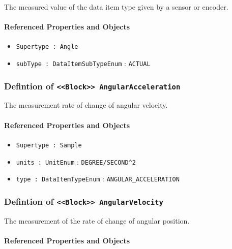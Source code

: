The measured value of the data item type given by a sensor or encoder.

\FloatBarrier
\paragraph{Referenced Properties and Objects}

\begin{itemize}
\item \texttt{Supertype : Angle}

\item \texttt{subType : DataItemSubTypeEnum} : \texttt{ACTUAL}

\end{itemize}
\FloatBarrier
\subsubsection{Defintion of \texttt{<<Block>> AngularAcceleration}}
  \label{type:AngularAcceleration}

\FloatBarrier

The measurement rate of change of angular velocity.

\FloatBarrier
\paragraph{Referenced Properties and Objects}

\begin{itemize}
\item \texttt{Supertype : Sample}

\item \texttt{units : UnitEnum} : \texttt{DEGREE/SECOND^2}

\item \texttt{type : DataItemTypeEnum} : \texttt{ANGULAR_ACCELERATION}

\end{itemize}
\FloatBarrier
\subsubsection{Defintion of \texttt{<<Block>> AngularVelocity}}
  \label{type:AngularVelocity}

\FloatBarrier

The measurement of the rate of change of angular position.

\FloatBarrier
\paragraph{Referenced Properties and Objects}

